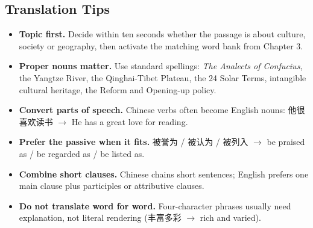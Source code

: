 \subsection{Translation Tips}

\begin{itemize}[leftmargin=1.4em]
  \item \textbf{Topic first.} Decide within ten seconds whether the passage is about culture, society or geography, then activate the matching word bank from Chapter 3.
  \item \textbf{Proper nouns matter.} Use standard spellings: \emph{The Analects of Confucius}, the Yangtze River, the Qinghai-Tibet Plateau, the 24 Solar Terms, intangible cultural heritage, the Reform and Opening-up policy.
  \item \textbf{Convert parts of speech.} Chinese verbs often become English nouns: 他很喜欢读书 $\to$ He has a great love for reading.
  \item \textbf{Prefer the passive when it fits.} 被誉为 / 被认为 / 被列入 $\to$ be praised as / be regarded as / be listed as.
  \item \textbf{Combine short clauses.} Chinese chains short sentences; English prefers one main clause plus participles or attributive clauses.
  \item \textbf{Do not translate word for word.} Four-character phrases usually need explanation, not literal rendering (丰富多彩 $\to$ rich and varied).
\end{itemize}
